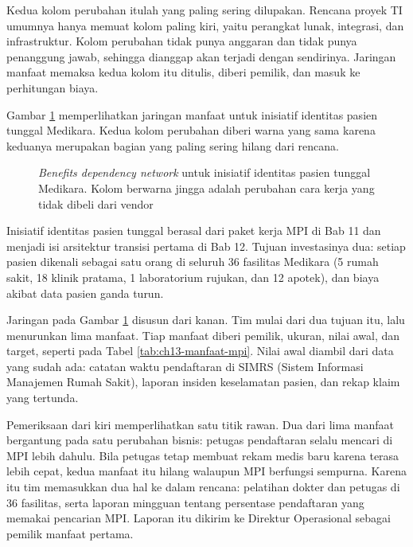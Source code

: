Kedua kolom perubahan itulah yang paling sering dilupakan. Rencana proyek TI
umumnya hanya memuat kolom paling kiri, yaitu perangkat lunak, integrasi, dan
infrastruktur. Kolom perubahan tidak punya anggaran dan tidak punya
penanggung jawab, sehingga dianggap akan terjadi dengan sendirinya. Jaringan
manfaat memaksa kedua kolom itu ditulis, diberi pemilik, dan masuk ke
perhitungan biaya.

Gambar \ref{fig:ch13-bdn} memperlihatkan jaringan manfaat untuk inisiatif
identitas pasien tunggal Medikara. Kedua kolom perubahan diberi warna yang
sama karena keduanya merupakan bagian yang paling sering hilang dari rencana.

\begin{figure}[!htb]
  \centering
  
  \caption{\textit{Benefits dependency network} untuk inisiatif identitas
           pasien tunggal Medikara. Kolom berwarna jingga adalah perubahan
           cara kerja yang tidak dibeli dari vendor}
  \label{fig:ch13-bdn}
\end{figure}

\begin{kasus}[title={Kasus Medikara Health: Jaringan Manfaat Identitas Pasien Tunggal}]
Inisiatif identitas pasien tunggal berasal dari paket kerja MPI di Bab 11 dan
menjadi isi arsitektur transisi pertama di Bab 12. Tujuan investasinya dua:
setiap pasien dikenali sebagai satu orang di seluruh 36 fasilitas Medikara (5
rumah sakit, 18 klinik pratama, 1 laboratorium rujukan, dan 12 apotek), dan
biaya akibat data pasien ganda turun.

Jaringan pada Gambar \ref{fig:ch13-bdn} disusun dari kanan. Tim mulai dari dua
tujuan itu, lalu menurunkan lima manfaat. Tiap manfaat diberi pemilik, ukuran,
nilai awal, dan target, seperti pada Tabel \ref{tab:ch13-manfaat-mpi}. Nilai
awal diambil dari data yang sudah ada: catatan waktu pendaftaran di SIMRS
(Sistem Informasi Manajemen Rumah Sakit), laporan insiden keselamatan pasien,
dan rekap klaim yang tertunda.

Pemeriksaan dari kiri memperlihatkan satu titik rawan. Dua dari lima manfaat
bergantung pada satu perubahan bisnis: petugas pendaftaran selalu mencari di
MPI lebih dahulu. Bila petugas tetap membuat rekam medis baru karena terasa
lebih cepat, kedua manfaat itu hilang walaupun MPI berfungsi sempurna. Karena
itu tim memasukkan dua hal ke dalam rencana: pelatihan dokter dan petugas di
36 fasilitas, serta laporan mingguan tentang persentase pendaftaran yang
memakai pencarian MPI. Laporan itu dikirim ke Direktur Operasional sebagai
pemilik manfaat pertama.
\end{kasus}

